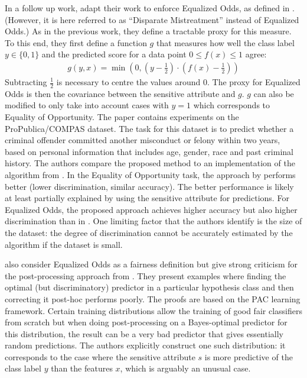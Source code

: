 In a follow up work, \citet{zafar2017fairnesstreatment} adapt their work to enforce Equalized Odds,
as defined in \citet{hardt2016equality}.
(However, it is here referred to as ``Disparate Mistreatment'' instead of Equalized Odds.)
As in the previous work, they define a tractable proxy for this measure.
To this end, they first define a function \(g\) that measures
how well the class label \(y \in \{0, 1\}\) and the predicted score for a data point \(0 \leq f(x) \leq 1\) agree:
\begin{align}
  \label{eq:zafar-constraint-2}
  g(y, x) = \min \left(0, \left(y - \tfrac{1}{2}\right) \cdot \left(f(x) - \tfrac{1}{2}\right)\right)
\end{align}
Subtracting \(\tfrac{1}{2}\) is necessary to centre the values around \(0\).
The proxy for Equalized Odds is then the covariance between the sensitive attribute and \(g\).
\(g\) can also be modified to only take into account cases with \(y=1\) which corresponds to Equality of Opportunity.
The paper contains experiments on the ProPublica/COMPAS dataset.
The task for this dataset is to predict
whether a criminal offender committed another misconduct or felony within two years,
based on personal information that includes age, gender, race and past criminal history.
The authors compare the proposed method to an implementation of the algorithm from \citet{hardt2016equality}.
In the Equality of Opportunity task, the approach by \citet{hardt2016equality} performs better
(lower discrimination, similar accuracy).
The better performance is likely at least partially explained
by \citet{hardt2016equality} using the sensitive attribute for predictions.
For Equalized Odds,
the proposed approach achieves higher accuracy but also higher discrimination than in \citet{hardt2016equality}.
One limiting factor that the authors identify is the size of the dataset:
the degree of discrimination cannot be accurately estimated by the algorithm if the dataset is small.

\citet{woodworth2017learning} also consider Equalized Odds as a fairness definition
but give strong criticism for the post-processing approach from \citet{hardt2016equality}.
They present examples where finding the optimal (but discriminatory) predictor in a particular hypothesis class
and then correcting it post-hoc performs poorly.
The proofs are based on the PAC learning framework.
Certain training distributions allow the training of good fair classifiers from scratch
but when doing post-processing on a Bayes-optimal predictor for this distribution,
the result can be a very bad predictor that gives essentially random predictions.
The authors explicitly construct one such distribution:
it corresponds to the case where the sensitive attribute \(s\) is more predictive of the class label \(y\)
than the features \(x\), which is arguably an unusual case.

